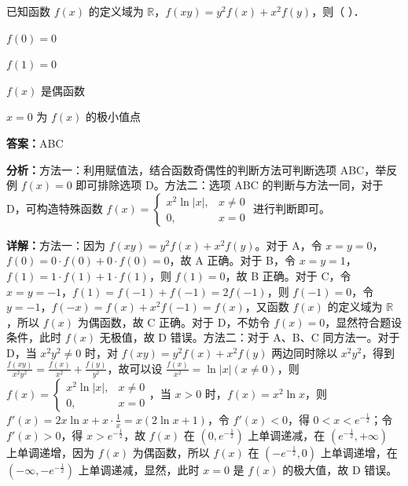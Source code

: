 \begin{question}[points=5]
已知函数 $f(x)$ 的定义域为 $\mathbb{R}$，$f(xy)=y^2f(x)+x^2f(y)$，则（ ）．
\begin{choices}
  \item $f(0)=0$
  \item $f(1)=0$
  \item $f(x)$ 是偶函数
  \item $x=0$ 为 $f(x)$ 的极小值点
\end{choices}
\begin{solution}
\textbf{答案：}ABC

\textbf{分析：}方法一：利用赋值法，结合函数奇偶性的判断方法可判断选项 ABC，举反例 $f(x)=0$ 即可排除选项 D。方法二：选项 ABC 的判断与方法一同，对于 D，可构造特殊函数 $f(x)=\begin{cases} x^2\ln|x|, & x\neq 0 \\ 0, & x=0 \end{cases}$ 进行判断即可。

\textbf{详解：}方法一：因为 $f(xy)=y^2f(x)+x^2f(y)$。对于 A，令 $x=y=0$，$f(0)=0\cdot f(0)+0\cdot f(0)=0$，故 A 正确。对于 B，令 $x=y=1$，$f(1)=1\cdot f(1)+1\cdot f(1)$，则 $f(1)=0$，故 B 正确。对于 C，令 $x=y=-1$，$f(1)=f(-1)+f(-1)=2f(-1)$，则 $f(-1)=0$，令 $y=-1$，$f(-x)=f(x)+x^2f(-1)=f(x)$，又函数 $f(x)$ 的定义域为 $\mathbb{R}$，所以 $f(x)$ 为偶函数，故 C 正确。对于 D，不妨令 $f(x)=0$，显然符合题设条件，此时 $f(x)$ 无极值，故 D 错误。方法二：对于 A、B、C 同方法一。对于 D，当 $x^2y^2\neq 0$ 时，对 $f(xy)=y^2f(x)+x^2f(y)$ 两边同时除以 $x^2y^2$，得到 $\frac{f(xy)}{x^2y^2}=\frac{f(x)}{x^2}+\frac{f(y)}{y^2}$，故可以设 $\frac{f(x)}{x^2}=\ln|x|(x\neq 0)$，则 $f(x)=\begin{cases} x^2\ln|x|, & x\neq 0 \\ 0, & x=0 \end{cases}$，当 $x>0$ 时，$f(x)=x^2\ln x$，则 $f'(x)=2x\ln x+x\cdot\frac{1}{x}=x(2\ln x+1)$，令 $f'(x)<0$，得 $0<x<e^{-\frac{1}{2}}$；令 $f'(x)>0$，得 $x>e^{-\frac{1}{2}}$，故 $f(x)$ 在 $(0,e^{-\frac{1}{2}})$ 上单调递减，在 $(e^{-\frac{1}{2}},+\infty)$ 上单调递增，因为 $f(x)$ 为偶函数，所以 $f(x)$ 在 $(-e^{-\frac{1}{2}},0)$ 上单调递增，在 $(-\infty,-e^{-\frac{1}{2}})$ 上单调递减，显然，此时 $x=0$ 是 $f(x)$ 的极大值，故 D 错误。
\end{solution}
\end{question}

